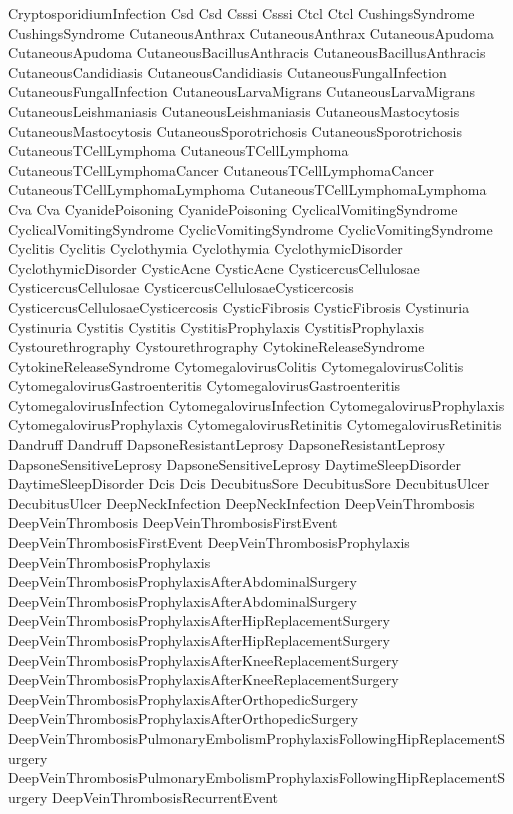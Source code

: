  CryptosporidiumInfection
 Csd
 Csd
 Csssi
 Csssi
 Ctcl
 Ctcl
 CushingsSyndrome
 CushingsSyndrome
 CutaneousAnthrax
 CutaneousAnthrax
 CutaneousApudoma
 CutaneousApudoma
 CutaneousBacillusAnthracis
 CutaneousBacillusAnthracis
 CutaneousCandidiasis
 CutaneousCandidiasis
 CutaneousFungalInfection
 CutaneousFungalInfection
 CutaneousLarvaMigrans
 CutaneousLarvaMigrans
 CutaneousLeishmaniasis
 CutaneousLeishmaniasis
 CutaneousMastocytosis
 CutaneousMastocytosis
 CutaneousSporotrichosis
 CutaneousSporotrichosis
 CutaneousTCellLymphoma
 CutaneousTCellLymphoma
 CutaneousTCellLymphomaCancer
 CutaneousTCellLymphomaCancer
 CutaneousTCellLymphomaLymphoma
 CutaneousTCellLymphomaLymphoma
 Cva
 Cva
 CyanidePoisoning
 CyanidePoisoning
 CyclicalVomitingSyndrome
 CyclicalVomitingSyndrome
 CyclicVomitingSyndrome
 CyclicVomitingSyndrome
 Cyclitis
 Cyclitis
 Cyclothymia
 Cyclothymia
 CyclothymicDisorder
 CyclothymicDisorder
 CysticAcne
 CysticAcne
 CysticercusCellulosae
 CysticercusCellulosae
 CysticercusCellulosaeCysticercosis
 CysticercusCellulosaeCysticercosis
 CysticFibrosis
 CysticFibrosis
 Cystinuria
 Cystinuria
 Cystitis
 Cystitis
 CystitisProphylaxis
 CystitisProphylaxis
 Cystourethrography
 Cystourethrography
 CytokineReleaseSyndrome
 CytokineReleaseSyndrome
 CytomegalovirusColitis
 CytomegalovirusColitis
 CytomegalovirusGastroenteritis
 CytomegalovirusGastroenteritis
 CytomegalovirusInfection
 CytomegalovirusInfection
 CytomegalovirusProphylaxis
 CytomegalovirusProphylaxis
 CytomegalovirusRetinitis
 CytomegalovirusRetinitis
 Dandruff
 Dandruff
 DapsoneResistantLeprosy
 DapsoneResistantLeprosy
 DapsoneSensitiveLeprosy
 DapsoneSensitiveLeprosy
 DaytimeSleepDisorder
 DaytimeSleepDisorder
 Dcis
 Dcis
 DecubitusSore
 DecubitusSore
 DecubitusUlcer
 DecubitusUlcer
 DeepNeckInfection
 DeepNeckInfection
 DeepVeinThrombosis
 DeepVeinThrombosis
 DeepVeinThrombosisFirstEvent
 DeepVeinThrombosisFirstEvent
 DeepVeinThrombosisProphylaxis
 DeepVeinThrombosisProphylaxis
 DeepVeinThrombosisProphylaxisAfterAbdominalSurgery
 DeepVeinThrombosisProphylaxisAfterAbdominalSurgery
 DeepVeinThrombosisProphylaxisAfterHipReplacementSurgery
 DeepVeinThrombosisProphylaxisAfterHipReplacementSurgery
 DeepVeinThrombosisProphylaxisAfterKneeReplacementSurgery
 DeepVeinThrombosisProphylaxisAfterKneeReplacementSurgery
 DeepVeinThrombosisProphylaxisAfterOrthopedicSurgery
 DeepVeinThrombosisProphylaxisAfterOrthopedicSurgery
 DeepVeinThrombosisPulmonaryEmbolismProphylaxisFollowingHipReplacementSurgery
 DeepVeinThrombosisPulmonaryEmbolismProphylaxisFollowingHipReplacementSurgery
 DeepVeinThrombosisRecurrentEvent
